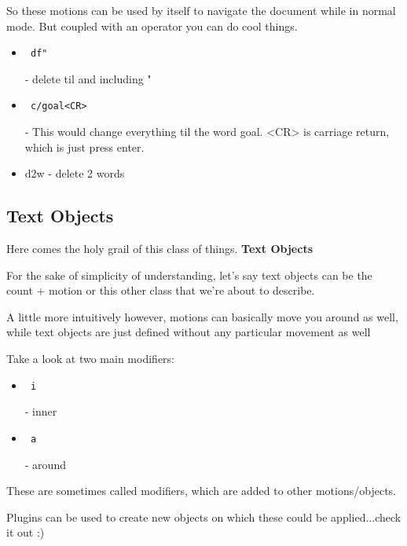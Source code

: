 \documentclass[12pt, letterpaper]{article}
\begin{document}
So these motions can be used by itself to navigate the document while in normal
mode. But coupled with an operator you can do cool things.


\begin{itemize}
    \item \begin{verbatim} df" \end{verbatim} - delete til and including " 
    \item \begin{verbatim} c/goal<CR> \end{verbatim} -  This would change
        everything til the word goal. <CR> is carriage return, which is just
        press enter. 
    \item d2w - delete 2 words
\end{itemize}

\subsection{Text Objects}
Here comes the holy grail of this class of things. \textbf{Text Objects}

For the sake of simplicity of understanding, let's say text objects can be the
count + motion or this other class that we're about to describe.

A little more intuitively however, motions can basically move you around as
well, while text objects are just defined without any particular movement as
well


Take a look at two main modifiers:
\begin{itemize}
    \item \begin{verbatim} i \end{verbatim} - inner 
    \item \begin{verbatim} a \end{verbatim} - around
\end{itemize}
These are sometimes called modifiers, which are added to other motions/objects.

Plugins can be used to create new objects on which these could be
applied...check it out :)
\end{document}
